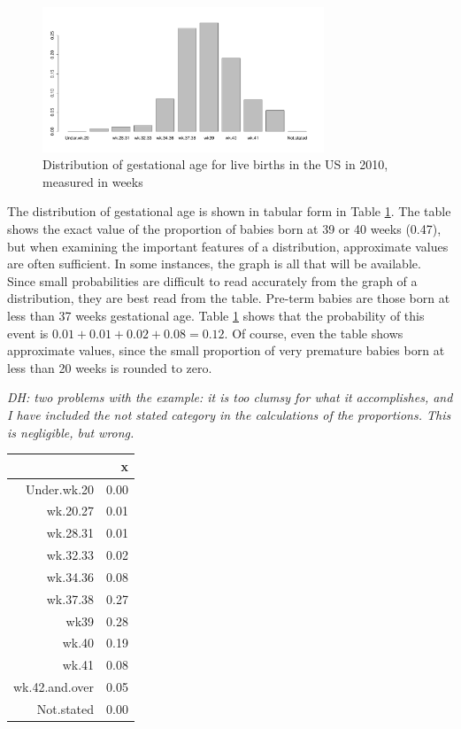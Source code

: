 \begin{figure}
  \centering
  \includegraphics[width=0.75\textwidth]{ch_probability_oi_biostat/figures/gestageMarginalDist/gestageMarginalDist.pdf}
  \caption{Distribution of gestational age for live births in the US in 2010, measured in weeks}
  \label{fig:gestageMarginalDist}
\end{figure}


The distribution of gestational age is shown in tabular form in Table \ref{gestageMarginalDistTable}.  The table shows the exact value of the proportion of babies born at 39 or 40 weeks (0.47), but when examining the important features of a distribution, approximate values are often sufficient.  In some instances, the graph is all that will be available.  Since small probabilities are difficult to read accurately from the graph of a distribution, they are best read from the table.  Pre-term babies are those born at less than 37 weeks gestational age.  Table \ref{gestageMarginalDistTable} shows that the probability of this event is $0.01 + 0.01 + 0.02 + 0.08 = 0.12$.  Of course, even the table shows approximate values, since the small proportion of very premature babies born at less than 20 weeks is rounded to zero.

\textit{DH: two problems with the example: it is too clumsy for what it accomplishes, and I have  included the not stated category in the calculations of the proportions.  This is negligible, but wrong.}

\begin{table}[ht]
\label{gestageMarginalDistTable}
\centering
\begin{tabular}{rr}
  \hline
 & x \\ 
  \hline
Under.wk.20 & 0.00 \\ 
  wk.20.27 & 0.01 \\ 
  wk.28.31 & 0.01 \\ 
  wk.32.33 & 0.02 \\ 
  wk.34.36 & 0.08 \\ 
  wk.37.38 & 0.27 \\ 
  wk39 & 0.28 \\ 
  wk.40 & 0.19 \\ 
  wk.41 & 0.08 \\ 
  wk.42.and.over & 0.05 \\ 
  Not.stated & 0.00 \\ 
   \hline
\end{tabular}
\end{table}

